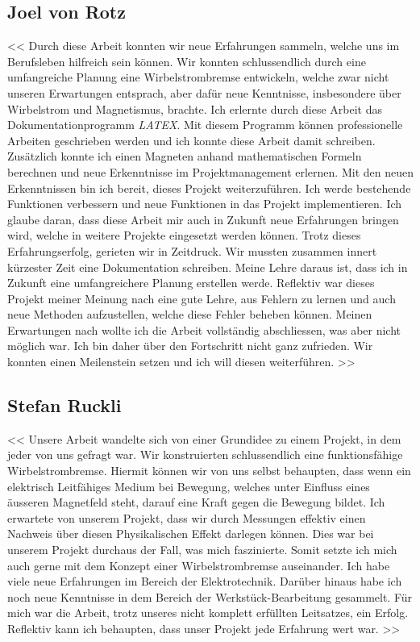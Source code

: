 
\subsection{Joel von Rotz}
<< Durch diese Arbeit konnten wir neue Erfahrungen sammeln, welche uns im Berufsleben hilfreich sein können. Wir konnten schlussendlich durch eine umfangreiche Planung eine Wirbelstrombremse entwickeln, welche zwar nicht unseren Erwartungen entsprach, aber dafür neue Kenntnisse, insbesondere über Wirbelstrom und Magnetismus, brachte.
\newpara
Ich erlernte durch diese Arbeit das Dokumentationprogramm \textit{LATEX}. Mit diesem Programm können professionelle Arbeiten geschrieben werden und ich konnte diese Arbeit damit schreiben. Zusätzlich konnte ich einen Magneten anhand mathematischen Formeln berechnen und neue Erkenntnisse im Projektmanagement erlernen. 
\newpara
Mit den neuen Erkenntnissen bin ich bereit, dieses Projekt weiterzuführen. Ich werde bestehende Funktionen verbessern und neue Funktionen in das Projekt implementieren. Ich glaube daran, dass diese Arbeit mir auch in Zukunft neue Erfahrungen bringen wird, welche in weitere Projekte eingesetzt werden können.
\newpara
Trotz dieses Erfahrungserfolg, gerieten wir in Zeitdruck. Wir mussten zusammen innert kürzester Zeit eine Dokumentation  schreiben. Meine Lehre daraus ist, dass ich in Zukunft eine umfangreichere Planung erstellen werde. Reflektiv war dieses Projekt meiner Meinung nach eine gute Lehre, aus Fehlern zu lernen und auch neue Methoden aufzustellen, welche diese Fehler beheben können.
\newpara 
Meinen Erwartungen nach wollte ich die Arbeit vollständig abschliessen, was aber nicht möglich war. Ich bin daher über den Fortschritt nicht ganz zufrieden. Wir konnten einen Meilenstein setzen und ich will diesen weiterführen. 
>>
\subsection{Stefan Ruckli}
<< Unsere Arbeit wandelte sich von einer Grundidee zu einem Projekt, in dem jeder von uns gefragt war. Wir konstruierten schlussendlich eine funktionsfähige Wirbelstrombremse. Hiermit können wir von uns selbst behaupten, dass wenn ein elektrisch Leitfähiges Medium bei Bewegung, welches unter Einfluss eines äusseren Magnetfeld steht, darauf eine Kraft gegen die Bewegung bildet.
\newpara
Ich erwartete von unserem Projekt, dass wir durch Messungen effektiv einen Nachweis über diesen Physikalischen Effekt darlegen können. Dies war bei unserem Projekt durchaus der Fall, was mich faszinierte. Somit setzte ich mich auch gerne mit dem Konzept einer Wirbelstrombremse auseinander. Ich habe viele neue Erfahrungen im Bereich der Elektrotechnik. Darüber hinaus habe ich noch neue Kenntnisse in dem Bereich der Werkstück-Bearbeitung gesammelt.
\newpage
Für mich war die Arbeit, trotz unseres nicht komplett erfüllten Leitsatzes, ein Erfolg. Reflektiv kann ich behaupten, dass unser Projekt jede Erfahrung wert war. >>
